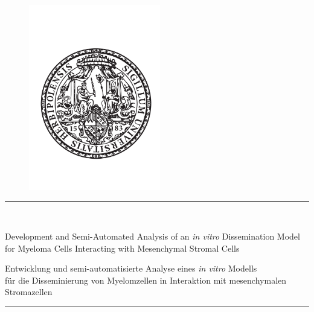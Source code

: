 



\thispagestyle{empty}   %

\begin{titlepage}
    \centering

    \begin{figure}[H]
        \centering
        \includegraphics[width=2.26in]{FIGS/0_neuSIEGEL.pdf}
    \end{figure}


    \vspace{\vhalf}
    \rule{\textwidth}{0.4pt} \\ %
    \vspace{7pt} %

    Development and Semi-Automated Analysis of an \textit{in vitro} Dissemination Model \\
    for Myeloma Cells Interacting with Mesenchymal Stromal Cells
    \vspace{\vhalf}

    Entwicklung und semi-automatisierte Analyse eines \textit{in vitro} Modells \\
    für die Disseminierung von Myelomzellen in Interaktion mit mesenchymalen Stromazellen
    \rule{\textwidth}{0.4pt} %




\end{titlepage}
